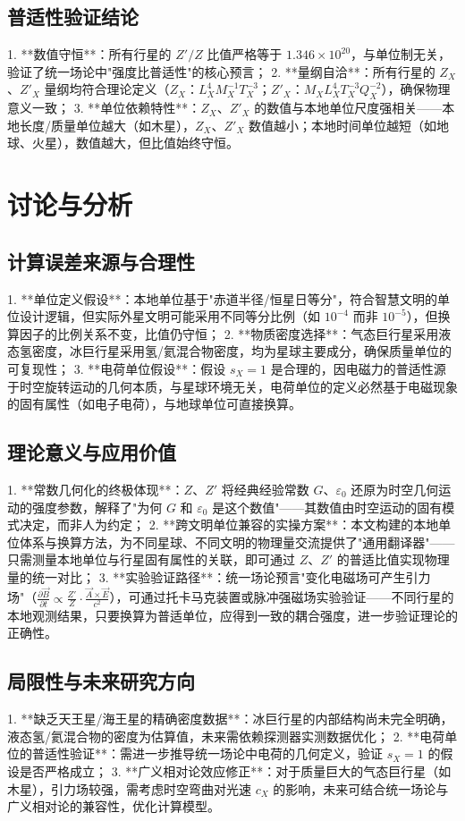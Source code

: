 \documentclass[a4paper, 12pt]{article}
\begin{document}
\subsection{普适性验证结论}
1. **数值守恒**：所有行星的 $Z'/Z$ 比值严格等于 $1.346 \times 10^{20}$，与单位制无关，验证了统一场论中"强度比普适性"的核心预言；
2. **量纲自洽**：所有行星的 $Z_X$、$Z'_X$ 量纲均符合理论定义（$Z_X$：$L_X^4 M_X^{-1} T_X^{-3}$；$Z'_X$：$M_X L_X^4 T_X^{-3} Q_X^{-2}$），确保物理意义一致；
3. **单位依赖特性**：$Z_X$、$Z'_X$ 的数值与本地单位尺度强相关——本地长度/质量单位越大（如木星），$Z_X$、$Z'_X$ 数值越小；本地时间单位越短（如地球、火星），数值越大，但比值始终守恒。

\section{讨论与分析}
\subsection{计算误差来源与合理性}
1. **单位定义假设**：本地单位基于"赤道半径/恒星日等分"，符合智慧文明的单位设计逻辑，但实际外星文明可能采用不同等分比例（如 $10^{-4}$ 而非 $10^{-5}$），但换算因子的比例关系不变，比值仍守恒；
2. **物质密度选择**：气态巨行星采用液态氢密度，冰巨行星采用氢/氦混合物密度，均为星球主要成分，确保质量单位的可复现性；
3. **电荷单位假设**：假设 $s_X = 1$ 是合理的，因电磁力的普适性源于时空旋转运动的几何本质，与星球环境无关，电荷单位的定义必然基于电磁现象的固有属性（如电子电荷），与地球单位可直接换算。

\subsection{理论意义与应用价值}
1. **常数几何化的终极体现**：$Z$、$Z'$ 将经典经验常数 $G$、$\varepsilon_0$ 还原为时空几何运动的强度参数，解释了"为何 $G$ 和 $\varepsilon_0$ 是这个数值"——其数值由时空运动的固有模式决定，而非人为约定；
2. **跨文明单位兼容的实操方案**：本文构建的本地单位体系与换算方法，为不同星球、不同文明的物理量交流提供了"通用翻译器"——只需测量本地单位与行星固有属性的关联，即可通过 $Z$、$Z'$ 的普适比值实现物理量的统一对比；
3. **实验验证路径**：统一场论预言"变化电磁场可产生引力场"（$\frac{\partial \vec{B}}{\partial t} \propto \frac{Z'}{Z} \cdot \frac{\vec{A} \times \vec{E}}{c^2}$）\cite{zhang2021experiment}，可通过托卡马克装置或脉冲强磁场实验验证——不同行星的本地观测结果，只要换算为普适单位，应得到一致的耦合强度，进一步验证理论的正确性。

\subsection{局限性与未来研究方向}
1. **缺乏天王星/海王星的精确密度数据**：冰巨行星的内部结构尚未完全明确，液态氢/氦混合物的密度为估算值，未来需依赖探测器实测数据优化；
2. **电荷单位的普适性验证**：需进一步推导统一场论中电荷的几何定义，验证 $s_X = 1$ 的假设是否严格成立；
3. **广义相对论效应修正**：对于质量巨大的气态巨行星（如木星），引力场较强，需考虑时空弯曲对光速 $c_X$ 的影响，未来可结合统一场论与广义相对论的兼容性，优化计算模型。
\end{document}
